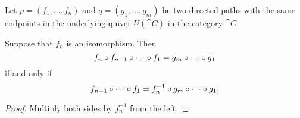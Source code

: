 \begin{lemma}\label{thm:inverting_isomorphisms_preserves_commutativity}
  Let \( p = (f_1, \ldots, f_n) \) and \( q = (g_1, \ldots, g_m) \) be two \hyperref[def:quiver_path/directed]{directed paths} with the same endpoints in the \hyperref[def:category]{underlying quiver} \( U(\cat{C}) \) in the \hyperref[def:category]{category} \( \cat{C} \).

  Suppose that \( f_n \) is an isomorphism. Then
  \begin{equation*}
    f_n \bincirc f_{n-1} \bincirc \cdots \bincirc f_1 = g_m \bincirc \cdots \bincirc g_1
  \end{equation*}
  if and only if
  \begin{equation*}
    f_{n-1} \bincirc \cdots \bincirc f_1 = f_n^{-1} \bincirc g_m \bincirc \cdots \bincirc g_1.
  \end{equation*}
\end{lemma}
\begin{proof}
  Multiply both sides by \( f_n^{-1} \) from the left.
\end{proof}

